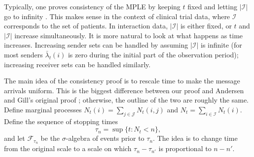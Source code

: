 \documentclass[aoas,preprint]{imsart}
\begin{document}
Typically, one proves consistency of the MPLE by keeping $t$ fixed
and letting $|\mathcal{I}|$ go to infinity
\cite{andersen1993statistical,andersen1982cox,cook2007statistical,fleming1991counting,
martinussen2006dynamic}.  This makes sense in the context of clinical trial
data, where $\mathcal{I}$ corresponds to the set of patients.  In interaction
data, $|\mathcal{I}|$ is either fixed, or $t$ and $|\mathcal{I}|$ increase
simultaneously.  It is more natural to look at what happens as time increases.
Increasing sender sets can be handled by assuming $|\mathcal{I}|$ is infinite
(for most senders $\bar \lambda_t(i)$ is zero during the initial
part of the observation period); increasing receiver sets can be
handled similarly.


The main idea of the consistency proof is to rescale time to make the message
arrivals uniform.  This is the biggest difference between our proof and
Andersen and Gill's original proof \cite{andersen1982cox}; otherwise, the
outline of the two are roughly the same.  
Define marginal processes
\(
    N_t(i) = \sum_{j \in \mathcal{J}} N_t(i,j)
\)
and
\(
    N_t = \sum_{i \in \mathcal{I}} N_t(i).
\)
Define the sequence of stopping
times
\begin{equation}\label{E:message-times}
    \tau_n = \sup\{ t : N_t < n \},
\end{equation}
and let $\mathcal{F}_{\tau_n}$ be the $\sigma$-algebra of events prior to
$\tau_n$. The idea is to change time from the original scale to a scale on
which $\tau_{n} - \tau_{n'}$ is proportional to $n - n'$.
\end{document}
